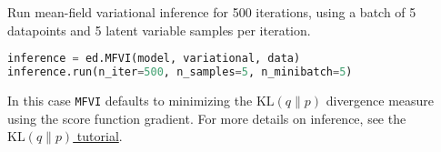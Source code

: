Run mean-field variational inference for 500 iterations, using a batch
of 5 datapoints and 5 latent variable samples per iteration.
\begin{lstlisting}[language=Python]
inference = ed.MFVI(model, variational, data)
inference.run(n_iter=500, n_samples=5, n_minibatch=5)
\end{lstlisting}
In this case
\texttt{MFVI} defaults to minimizing the
$\text{KL}(q\|p)$ divergence measure using the score function
gradient.
For more details on inference, see the \href{tut_KLqp.html}{$\text{KL}(q\|p)$ tutorial}.


